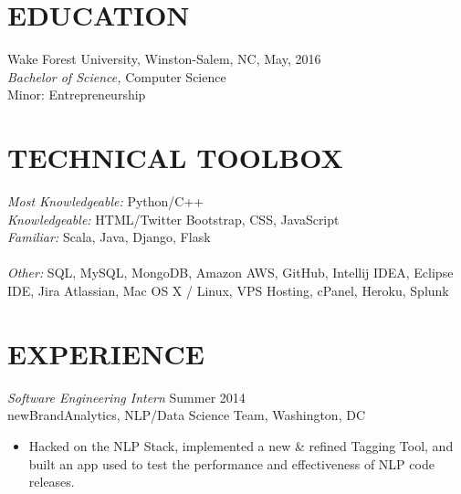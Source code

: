 \documentclass[margin=0.5in, 10pt]{res} %
\begin{document}
\begin{resume}


\section{EDUCATION}

Wake Forest University, Winston-Salem, NC, May, 2016 \\
{\sl Bachelor of Science,} Computer Science \\
Minor: Entrepreneurship 
 

\section{TECHNICAL TOOLBOX} 

{\sl Most Knowledgeable:} Python/C++ \\
{\sl Knowledgeable:} HTML/Twitter Bootstrap, CSS, JavaScript \\
{\sl Familiar:} Scala, Java, Django, Flask \\ \\
{\sl Other:} SQL, MySQL, MongoDB, Amazon AWS, GitHub, Intellij IDEA, Eclipse IDE, Jira Atlassian, Mac OS X / Linux, VPS Hosting, cPanel, Heroku, Splunk
 
 
\section{EXPERIENCE}

{\sl Software Engineering Intern} \hfill Summer 2014 \\
newBrandAnalytics, NLP/Data Science Team, Washington, DC 

\begin{itemize} \itemsep -2pt %
\item Hacked on the NLP Stack, implemented a new \& refined Tagging Tool, and built an app used to test the performance and effectiveness of NLP code releases. 
\end{itemize}
 

\end{resume}
\end{document}
